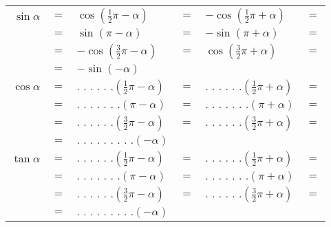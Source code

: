 \begin{minipage}{.7\textwidth}
\begin{center}
\begin{tabular}{rclclc}
$\sin \alpha$ & $=$ & $\cos \left(\frac{1}{2}\pi-\alpha \right)$ 
              & $=$ & $-\cos \left(\frac{1}{2}\pi+\alpha \right)$ & $=$\\
              & $=$ & $\sin \left(\pi-\alpha \right)$  
              & $=$ & $-\sin \left(\pi+\alpha \right)$ & $=$ \\
              & $=$ & $-\cos \left(\frac{3}{2}\pi-\alpha \right)$  
              & $=$ & $\cos \left(\frac{3}{2}\pi+\alpha \right)$ & $=$ \\
              & $=$ & $-\sin \left(-\alpha \right)$ \\
$\cos \alpha$ & $=$ & $\text{. . . . . .}
                       \left(\frac{1}{2}\pi-\alpha \right)$ 
              & $=$ & $\text{. . . . . .}
                       \left(\frac{1}{2}\pi+\alpha \right)$ & $=$\\
              & $=$ & $\text{. . . . . . .}
                       \left(\pi-\alpha \right)$  
              & $=$ & $\text{. . . . . . .}
                       \left(\pi+\alpha \right)$ & $=$ \\
              & $=$ & $\text{. . . . . .}
                       \left(\frac{3}{2}\pi-\alpha \right)$  
              & $=$ & $\text{. . . . . .}
                       \left(\frac{3}{2}\pi+\alpha \right)$ & $=$ \\
              & $=$ & $\text{. . . . . . . . .}
                       \left(-\alpha \right)$ \\
$\tan \alpha$ & $=$ & $\text{. . . . . .}
                       \left(\frac{1}{2}\pi-\alpha \right)$ 
              & $=$ & $\text{. . . . . .}
                       \left(\frac{1}{2}\pi+\alpha \right)$ & $=$\\
              & $=$ & $\text{. . . . . . .}
                       \left(\pi-\alpha \right)$  
              & $=$ & $\text{. . . . . . .}
                       \left(\pi+\alpha \right)$ & $=$ \\
              & $=$ & $\text{. . . . . .}
                       \left(\frac{3}{2}\pi-\alpha \right)$  
              & $=$ & $\text{. . . . . .}
                       \left(\frac{3}{2}\pi+\alpha \right)$ & $=$ \\
              & $=$ & $\text{. . . . . . . . .}
                       \left(-\alpha \right)$ 
\end{tabular}
\end{center}
\end{minipage}

